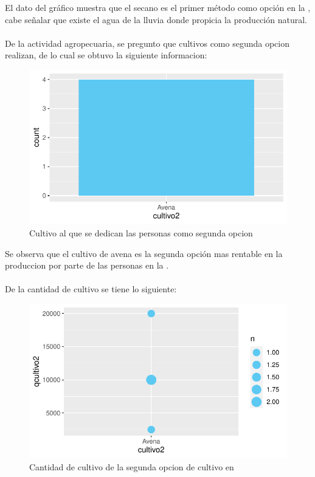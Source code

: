 \documentclass[12pt]{article}\usepackage[]{graphicx}\usepackage[]{xcolor}
\makeatletter
\def\maxwidth{ %
  \ifdim\Gin@nat@width>\linewidth
    \linewidth
  \else
    \Gin@nat@width
  \fi
}
\newenvironment{knitrout}{}{} %
\makeatother
\begin{document}
	El dato del gráfico muestra que el secano es el primer método como opción en la \comunidad, cabe señalar que existe el agua de la lluvia donde propicia la producción natural.\\
	\\
	De la actividad agropecuaria, se pregunto que cultivos como segunda opcion realizan, de lo cual se obtuvo la siguiente informacion:
	\begin{figure}[H]
	\centering
\begin{knitrout}
\color{fgcolor}
\includegraphics[width=\maxwidth]{figure/nine-1} 
\end{knitrout}
	\caption{Cultivo al que se dedican las personas como segunda opcion}
	\end{figure}
	Se observa que el cultivo de avena es la segunda opción mas rentable en la produccion por parte de las personas en la \comunidad.\\
	\\
	De la cantidad de cultivo se tiene lo siguiente:
	\begin{figure}[H]
	\centering
\begin{knitrout}
\color{fgcolor}
\includegraphics[width=\maxwidth]{figure/ten-1} 
\end{knitrout}
	\caption{Cantidad de cultivo de la segunda opcion de cultivo en \comunidad}
	\end{figure}
\end{document}
